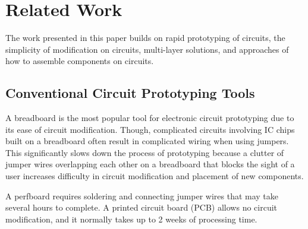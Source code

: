 \section{Related Work}
The work presented in this paper builds on rapid prototyping of circuits, the simplicity of modification on circuits, multi-layer solutions, and approaches of how to assemble components on circuits.

\subsection{Conventional Circuit Prototyping Tools}

A breadboard is the most popular tool for electronic circuit prototyping due to its ease of circuit modification. Though, complicated circuits involving IC chips built on a breadboard often result in complicated wiring when using jumpers. This significantly slows down the process of prototyping because a clutter of jumper wires overlapping each other on a breadboard that blocks the sight of a user increases difficulty in circuit modification and placement of new components.


A perfboard requires soldering and connecting jumper wires that may take several hours to complete. A printed circuit board (PCB) allows no circuit modification, and it normally takes up to 2 weeks of processing time.




